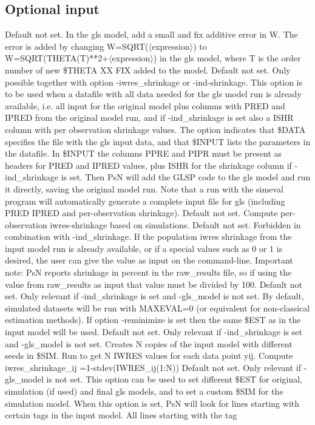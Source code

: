 \subsection{Optional input}

\begin{optionlist}
Default not set. In the gls model, add a small and fix additive error in W. 
The error is added by changing W=SQRT($\langle$expression$\rangle$) to W=SQRT(THETA(T)**2+$\langle$expression$\rangle$) in the 
gls model, where T is the order number of new \$THETA XX FIX added to the model. 
\nextopt
{}
Default not set. Only possible together with option -iwres\_shrinkage or -ind-shrinkage. This option is to be used when a datafile with all
data needed for the gls model run is already available, i.e. all input for the original model plus columns with PRED and IPRED from the 
original model run, and if -ind\_shrinkage is set also a ISHR column with per observation shrinkage values. The option indicates that \$DATA 
specifies the file with the gls input data, and that \$INPUT lists the parameters in the datafile. In \$INPUT the columns PPRE and PIPR must 
be present as headers for PRED and IPRED values, plus ISHR for the shrinkage column if -ind\_shrinkage is set. 
Then PsN will add the GLSP code to the gls model and run it directly, saving the original model run.
Note that a run with the simeval program will automatically generate a complete input file for gls (including PRED IPRED and per-observation 
shrinkage).
\nextopt
{}
Default not set. Compute per-observation iwres-shrinkage based on simulations. 
\nextopt
{}
Default not set. Forbidden in combination with -ind\_shrinkage. If the population iwres shrinkage from the input model run is already available, 
or if a special values such as 0 or 1 is desired, the user can give the value as input on the command-line. Important note: PsN reports shrinkage
in percent in the raw\_results file, so if using the value from raw\_results as input that value must be divided by 100.   
\nextopt
{}
Default not set. Only relevant if -ind\_shrinkage is set and -gls\_model is not set. By default, simulated datasets will be run with MAXEVAL=0 
(or equivalent for non-classical estimation methods). If option -reminimize is set then the same \$EST as in the input model will be used. 
\nextopt
{}
Default not set. Only relevant if -ind\_shrinkage is set and -gls\_model is not set. Creates N copies of the input model with different seeds in \$SIM. 
Run to get N IWRES values for each data point yij. 
Compute iwres\_shrinkage\_ij =1-stdev(IWRES_ij(1:N))
\nextopt
{}
Default not set. Only relevant if -gls\_model is not set. This option can be used to set different \$EST for original, simulation (if used) and final gls 
models, and to set a custom \$SIM for the simulation model. When this option is set, PsN will look for lines starting with certain tags in the input model. 
All lines starting with the tag


\end{optionlist}
